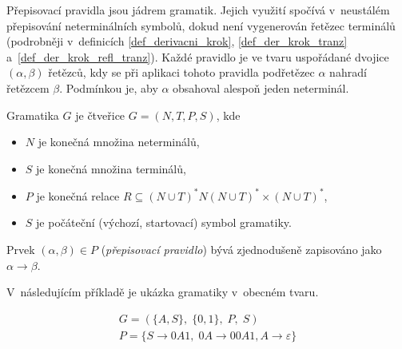 Přepisovací pravidla jsou jádrem gramatik.
Jejich využití spočívá v~neustálém přepisování neterminálních symbolů, dokud není vygenerován řetězec terminálů (podrobněji v~definicích \ref{def_derivacni_krok}, \ref{def_der_krok_tranz} a~\ref{def_der_krok_refl_tranz}).
Každé pravidlo je ve tvaru uspořádané dvojice $(\alpha, \beta)$ řetězců, kdy se při aplikaci tohoto pravidla podřetězec $\alpha$ nahradí řetězcem $\beta$.
Podmínkou je, aby $\alpha$ obsahoval alespoň jeden neterminál.

\begin{definition}\label{def_gramatika}
    Gramatika $G$ je čtveřice $G = (N, T, P, S)$, kde
    \begin{itemize}
        \item $N$ je konečná množina neterminálů,
        \item $S$ je konečná množina terminálů,
        \item $P$ je konečná relace $R \subseteq (N \cup T)^*N(N \cup T)^* \times (N \cup T)^*$,
        \item $S$ je počáteční (výchozí, startovací) symbol gramatiky.
    \end{itemize}
    Prvek $(\alpha, \beta) \in P$ (\emph{přepisovací pravidlo}) bývá zjednodušeně zapisováno jako $\alpha \rightarrow \beta$.
\end{definition}
V~následujícím příkladě je ukázka gramatiky v~obecném tvaru.
\begin{example}
    \begin{gather*}
        G = (\{A, S\},\; \{0, 1\},\; P,\; S) \\
        P = \{S \rightarrow 0A1,\; 0A \rightarrow 00A1, A \rightarrow \varepsilon\}
    \end{gather*}
\end{example}

